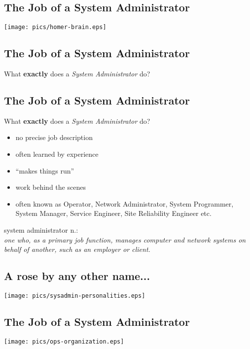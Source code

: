 \documentclass[xga]{xdvislides}
\begin{document}
\subsection{The Job of a System Administrator}
\vspace*{\fill}
\begin{center}
	\texttt{[image: pics/homer-brain.eps]} \\
\end{center}
\vspace*{\fill}

\subsection{The Job of a System Administrator}
What {\bf exactly} does a {\em System Administrator} do?

\subsection{The Job of a System Administrator}
What {\bf exactly} does a {\em System Administrator} do?
\begin{itemize}
	\item no precise job description
	\item often learned by experience
	\item ``makes things run''
	\item work behind the scenes
	\item often known as Operator, Network Administrator, System Programmer, System
		Manager, Service Engineer, Site Reliability Engineer etc.
\end{itemize}
\vfill
system administrator n.: \\
{\em one who, as a primary job function,
	manages computer and network systems on behalf of another, such as an
	employer or client.}

\subsection{A rose by any other name...}
\vspace*{\fill}
\begin{center}
	\texttt{[image: pics/sysadmin-personalities.eps]} \\
\end{center}
\vspace*{\fill}

\subsection{The Job of a System Administrator}
\vspace*{\fill}
\begin{center}
	\texttt{[image: pics/ops-organization.eps]} \\
\end{center}
\vspace*{\fill}
\end{document}
